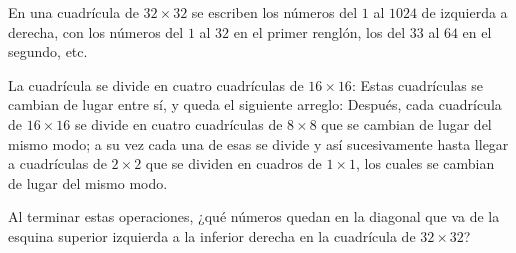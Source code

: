 En una cuadrícula de $32\times 32$ se escriben los números del $1$ al $1024$ de izquierda a derecha, con los números del $1$ al $32$ en el primer renglón, los del $33$ al $64$ en el segundo, etc. 

La cuadrícula se divide en cuatro cuadrículas de $16\times 16$:
 \newline 
Estas cuadrículas se cambian de lugar entre sí, y queda el siguiente arreglo:
 \newline 
Después, cada cuadrícula de $16\times 16$ se divide en cuatro cuadrículas de $8\times 8$ que se cambian de lugar del mismo modo; a su vez cada una de esas se divide y así sucesivamente hasta llegar a cuadrículas de $2\times 2$ que se dividen en cuadros de $1\times 1$, los cuales se cambian de lugar del mismo modo.

Al terminar estas operaciones, ¿qué números quedan en la diagonal que va de la esquina superior izquierda a la inferior derecha en la cuadrícula de $32\times 32$?